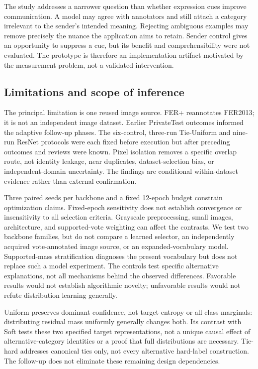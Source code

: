 \documentclass[pdflatex,sn-mathphys-num]{sn-jnl}
\begin{document}
The study addresses a narrower question than whether expression cues improve communication. A model may agree with annotators and still attach a category irrelevant to the sender's intended meaning. Rejecting ambiguous examples may remove precisely the nuance the application aims to retain. Sender control gives an opportunity to suppress a cue, but its benefit and comprehensibility were not evaluated. The prototype is therefore an implementation artifact motivated by the measurement problem, not a validated intervention.

\subsection{Limitations and scope of inference}
The principal limitation is one reused image source. FER+ reannotates FER2013; it is not an independent image dataset. Earlier PrivateTest outcomes informed the adaptive follow-up phases. The six-control, three-run Tie-Uniform and nine-run ResNet protocols were each fixed before execution but after preceding outcomes and reviews were known. Pixel isolation removes a specific overlap route, not identity leakage, near duplicates, dataset-selection bias, or independent-domain uncertainty. The findings are conditional within-dataset evidence rather than external confirmation.

Three paired seeds per backbone and a fixed 12-epoch budget constrain optimization claims. Fixed-epoch sensitivity does not establish convergence or insensitivity to all selection criteria. Grayscale preprocessing, small images, architecture, and supported-vote weighting can affect the contrasts. We test two backbone families, but do not compare a learned selector, an independently acquired vote-annotated image source, or an expanded-vocabulary model. Supported-mass stratification diagnoses the present vocabulary but does not replace such a model experiment. The controls test specific alternative explanations, not all mechanisms behind the observed differences. Favorable results would not establish algorithmic novelty; unfavorable results would not refute distribution learning generally.

Uniform preserves dominant confidence, not target entropy or all class marginals: distributing residual mass uniformly generally changes both. Its contrast with Soft tests these two specified target representations, not a unique causal effect of alternative-category identities or a proof that full distributions are necessary. Tie-hard addresses canonical ties only, not every alternative hard-label construction. The follow-up does not eliminate these remaining design dependencies.
\end{document}
